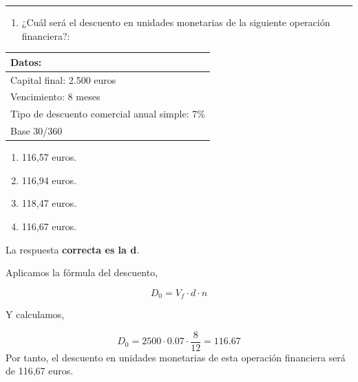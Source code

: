 \documentclass[
  letterpaper,
  DIV=11,
  numbers=noendperiod]{scrreprt}
\providecommand{\tightlist}{%
  \setlength{\itemsep}{0pt}\setlength{\parskip}{0pt}}\usepackage{longtable,booktabs,array}
\begin{document}
\begin{center}\rule{0.5\linewidth}{0.5pt}\end{center}

\begin{enumerate}
\def\labelenumi{\arabic{enumi}.}
\setcounter{enumi}{3}
\tightlist
\item
  ¿Cuál será el descuento en unidades monetarias de la siguiente
  operación financiera?:
\end{enumerate}

\begin{longtable}[]{@{}l@{}}
\toprule()
\textbf{Datos:} \\
\midrule()
\endhead
Capital final: 2.500 euros \\
Vencimiento: 8 meses \\
Tipo de descuento comercial anual simple: 7\% \\
Base 30/360 \\
\bottomrule()
\end{longtable}

\begin{enumerate}
\def\labelenumi{\alph{enumi})}
\item
  116,57 euros.
\item
  116,94 euros.
\item
  118,47 euros.
\item
  116,67 euros.
\end{enumerate}

\begin{tcolorbox}[enhanced jigsaw, left=2mm, opacityback=0, colback=white, breakable, arc=.35mm, bottomrule=.15mm, rightrule=.15mm, toprule=.15mm, leftrule=.75mm, colframe=quarto-callout-tip-color-frame]
\begin{minipage}[t]{5.5mm}
\textcolor{quarto-callout-tip-color}{\faLightbulb}
\end{minipage}%
\begin{minipage}[t]{\textwidth - 5.5mm}

La respuesta \textbf{correcta es la d}.

Aplicamos la fórmula del descuento,

\[D_0=V_f\cdot d\cdot n\]

Y calculamos,

\[D_0=2500\cdot0.07\cdot\frac{8}{12}=116.67\] Por tanto, el descuento en
unidades monetarias de esta operación financiera será de 116,67 euros.

\end{minipage}%
\end{tcolorbox}
\end{document}
